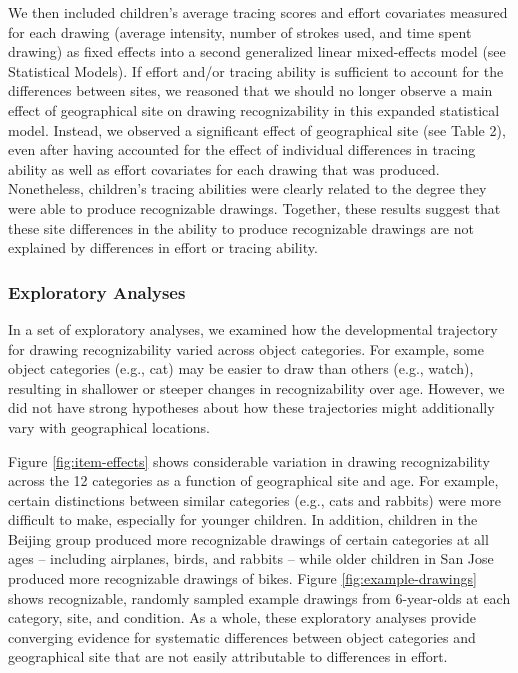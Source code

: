 \documentclass[
  english,
  man]{apa6}
\begin{document}
We then included children's average tracing scores and effort covariates measured for each drawing (average intensity, number of strokes used, and time spent drawing) as fixed effects into a second generalized linear mixed-effects model (see Statistical Models).
If effort and/or tracing ability is sufficient to account for the differences between sites, we reasoned that we should no longer observe a main effect of geographical site on drawing recognizability in this expanded statistical model.
Instead, we observed a significant effect of geographical site (see Table 2), even after having accounted for the effect of individual differences in tracing ability as well as effort covariates for each drawing that was produced. Nonetheless, children's tracing abilities were clearly related to the degree they were able to produce recognizable drawings. Together, these results suggest that these site differences in the ability to produce recognizable drawings are not explained by differences in effort or tracing ability.

\hypertarget{exploratory-analyses}{%
\subsubsection{Exploratory Analyses}\label{exploratory-analyses}}

In a set of exploratory analyses, we examined how the developmental trajectory for drawing recognizability varied across object categories. For example, some object categories (e.g., cat) may be easier to draw than others (e.g., watch), resulting in shallower or steeper changes in recognizability over age. However, we did not have strong hypotheses about how these trajectories might additionally vary with geographical locations.

Figure \ref{fig:item-effects} shows considerable variation in drawing recognizability across the 12 categories as a function of geographical site and age. For example, certain distinctions between similar categories (e.g., cats and rabbits) were more difficult to make, especially for younger children. In addition, children in the Beijing group produced more recognizable drawings of certain categories at all ages -- including airplanes, birds, and rabbits -- while older children in San Jose produced more recognizable drawings of bikes. Figure \ref{fig:example-drawings} shows recognizable, randomly sampled example drawings from 6-year-olds at each category, site, and condition. As a whole, these exploratory analyses provide converging evidence for systematic differences between object categories and geographical site that are not easily attributable to differences in effort.
\end{document}
